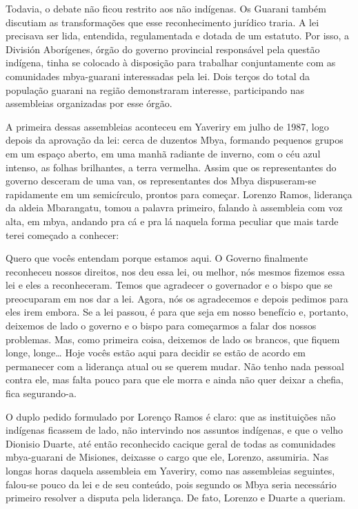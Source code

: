 Todavia, o debate não ficou restrito aos não indígenas. Os Guarani
também discutiam as transformações que esse reconhecimento jurídico
traria. A lei precisava ser lida, entendida, regulamentada e dotada de
um estatuto. Por isso, a División Aborígenes, órgão do governo
provincial responsável pela questão indígena, tinha se colocado à
disposição para trabalhar conjuntamente com as comunidades mbya-guarani
interessadas pela lei. Dois terços do total da população guarani na
região demonstraram interesse, participando nas assembleias organizadas
por esse órgão. 

A primeira dessas assembleias aconteceu em Yaveriry em julho de 1987,
logo depois da aprovação da lei: cerca de duzentos Mbya, formando
pequenos grupos em um espaço aberto, em uma manhã radiante de inverno,
com o céu azul intenso, as folhas brilhantes, a terra vermelha. Assim
que os representantes do governo desceram de uma van, os representantes
dos Mbya dispuseram-se rapidamente em um semicírculo, prontos para
começar. Lorenzo Ramos, liderança da aldeia Mbarangatu, tomou a palavra
primeiro, falando à assembleia com voz alta, em mbya, andando pra cá e
pra lá naquela forma peculiar que mais tarde terei começado a conhecer:

Quero que vocês entendam porque estamos aqui. O Governo finalmente
reconheceu nossos direitos, nos deu essa lei, ou melhor, nós mesmos
fizemos essa lei e eles a reconheceram. Temos que agradecer o
governador e o bispo que se preocuparam em nos dar a lei. Agora, nós os
agradecemos e depois pedimos para eles irem embora. Se a lei passou, é
para que seja em nosso benefício e, portanto, deixemos de lado o
governo e o bispo para começarmos a falar dos nossos problemas. Mas,
como primeira coisa, deixemos de lado os brancos, que fiquem longe,
longe\ldots{} Hoje vocês estão aqui para decidir se estão de acordo em
permanecer com a liderança atual ou se querem mudar. Não tenho nada
pessoal contra ele, mas falta pouco para que ele morra e ainda não quer
deixar a chefia, fica segurando-a.

O duplo pedido formulado por Lorenço Ramos é claro: que as instituições
não indígenas ficassem de lado, não intervindo nos assuntos indígenas,
e que o velho Dionisio Duarte, até então reconhecido cacique geral de
todas as comunidades mbya-guarani de Misiones, deixasse o cargo que
ele, Lorenzo, assumiria. Nas longas horas daquela assembleia em
Yaveriry, como nas assembleias seguintes, falou-se pouco da lei e de
seu conteúdo, pois segundo os Mbya seria necessário primeiro resolver a
disputa pela liderança. De fato, Lorenzo e Duarte a queriam.

